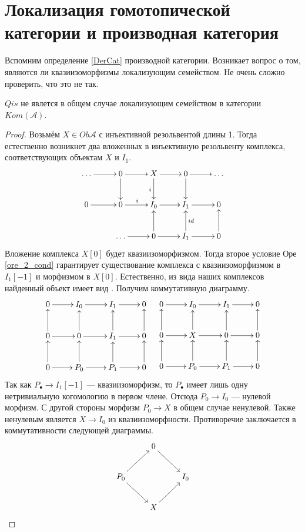 \documentclass[../main.tex]{subfiles}
\begin{document}
\section{Локализация гомотопической категории и производная категория}
Вспомним определение \ref{DerCat} производной категории. 
Возникает вопрос о том, являются ли квазиизоморфизмы локализующим семейством. 
Не очень сложно проверить, что это не так.
\begin{to_suj}\label{Kom_Qis_counterex}
$Qis$ не явлется в общем случае локализующим семейством в категории $Kom(\mathcal{A})$.
\end{to_suj}
\begin{proof}
Возьмём $X\in Ob\mathcal{A}$ с инъективной резольвентой длины 1. 
Тогда естественно возникнет два вложенных в инъективную резольвенту комплекса, соответствующих объектам $X$ и $I_1$.
\begin{equation*}
\xymatrix{
\ldots\ar[r]&0\ar[r]\ar[d]&X\ar[r]\ar[d]_i&0\ar[d]\ar[r]&\ldots\\
0\ar[r]&0\ar[r]^i&I_0\ar[r]&I_1\ar[r]&0\\
&\ldots\ar[r]&0\ar[r]\ar[u]&I_1\ar[u]_{id}\ar[r]&0\ar[u]
}
\end{equation*}
Вложение комплекса $X[0]$ будет квазиизоморфизмом. 
Тогда второе условие Оре \eqref{ore_2_cond} гарантирует существование комплекса с квазиизоморфизмом в $I_1[-1]$ и морфизмом в $X[0]$. 
Естественно, из вида наших комплексов найденный объект имеет вид . Получим коммутативную диаграмму.
\begin{equation*}
    \xymatrix{0\ar[r]&I_0\ar[r]&I_1\ar[r]&0\\
    0\ar[u]\ar[r]&0\ar[u]\ar[r]&I_1\ar[r]\ar[u]&0\ar[u]\\
    0\ar[u]\ar[r]&P_0\ar[r]\ar[u]&P_1\ar[r]\ar[u]&0\ar[u]}\quad
    \xymatrix{0\ar[r]&I_0\ar[r]&I_1\ar[r]&0\\
    0\ar[u]\ar[r]&X\ar[u]\ar[r]&0\ar[r]\ar[u]&0\ar[u]\\
    0\ar[u]\ar[r]&P_0\ar[r]\ar[u]&P_1\ar[r]\ar[u]&0\ar[u]}
\end{equation*}
Так как $P_\bullet\to I_1[-1]$ --- квазиизоморфизм, то $P_\bullet$ имеет лишь одну нетривиальную когомологию в первом члене. Отсюда $P_0\to I_0$ --- нулевой морфизм.
С другой стороны морфизм $P_0\to X$ в общем случае ненулевой. Также ненулевым является $X\to I_0$ из квазиизоморфности. Противоречие заключается в коммутативности следующей диаграммы.
\begin{equation*}
    \xymatrix{&0\ar[rd]\\
    P_0\ar[ru]\ar[rd]&&I_0\\
    &X\ar[ru]}
\end{equation*}
\end{proof}
\end{document}
